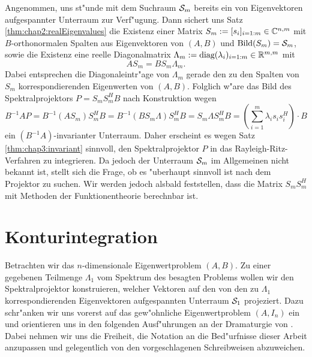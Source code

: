 \newpage

Angenommen, uns st"unde mit dem Suchraum $\S_m$ bereits ein von Eigenvektoren
aufgespannter Unterraum zur Verf"ugung. Dann sichert uns Satz \ref{thm:chap2:realEigenvalues} die Existenz einer Matrix $S_m := [s_i]_{i=1:m}\in\C^{n,m}$ mit
$B$-orthonormalen Spalten aus Eigenvektoren von $(A,B)$ und $\Bild(S_m)=\S_m$, sowie die Existenz eine reelle Diagonalmatrix
$\Lambda_m := \text{diag}(\lambda_i)_{i=1:m}\in\R^{m,m}$ mit
\[
AS_m = BS_m\Lambda_m.
\]
Dabei entsprechen die Diagonaleintr"age von $\Lambda_m$ gerade den zu den Spalten
von $S_m$ korrespondierenden Eigenwerten von $(A,B)$. Folglich w"are das Bild
des Spektralprojektors $P=S_m S_m^H B$ nach Konstruktion wegen
\[
B^{-1}AP = B^{-1}(AS_m)S_m^H B = B^{-1}(BS_m \Lambda)S_m^H B
= S_m\Lambda S_m^H B = \left(\sum_{i=1}^m \lambda_i s_i s_i^H\right)\cdot B
\]
ein $(B^{-1}A)$-invarianter Unterraum. Daher erscheint es
wegen Satz \ref{thm:chap3:invariant} sinnvoll, den Spektralprojektor $P$ in das
Rayleigh-Ritz-Verfahren zu integrieren.
Da jedoch der Unterraum $\S_m$ im Allgemeinen nicht bekannt ist, stellt sich die Frage, ob es
"uberhaupt sinnvoll ist nach dem Projektor zu suchen.
Wir werden jedoch alsbald feststellen, dass %
die Matrix $S_m S_m^H$ mit Methoden der Funktionentheorie berechnbar ist.

\section{Konturintegration}\label{sec:chap3:konturintegration}

Betrachten wir das $n$-dimensionale Eigenwertproblem $(A,B)$. Zu einer gegebenen Teilmenge $\Lambda_1$ vom Spektrum des besagten Problems wollen wir
den Spektralprojektor konstruieren, welcher Vektoren auf den von den zu $\Lambda_1$ korrespondierenden Eigenvektoren aufgespannten Unterraum $\S_1$ projeziert.
Dazu schr"anken wir uns vorerst auf das gew"ohnliche Eigenwertproblem $(A,I_n)$ ein und orientieren
uns in
den folgenden Ausf"uhrungen an der Dramaturgie von \cite[Abschnitt 4.9]{liesen}.
Dabei nehmen wir uns die Freiheit, die Notation an die Bed"urfnisse dieser Arbeit anzupassen und gelegentlich von den vorgeschlagenen Schreibweisen abzuweichen.\\

